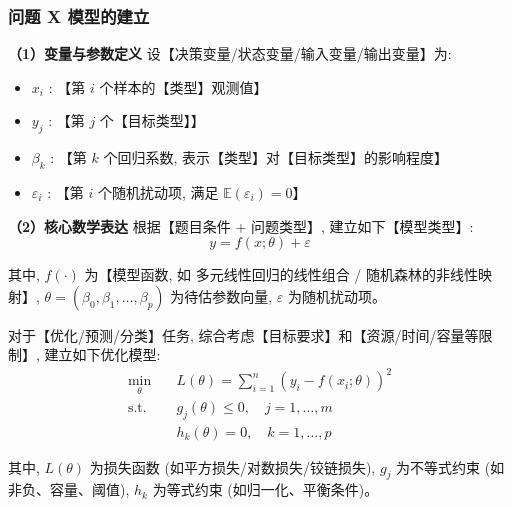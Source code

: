 
\subsubsection{问题 X 模型的建立}

\textbf{（1）变量与参数定义} \quad 设【决策变量/状态变量/输入变量/输出变量】为:
\begin{itemize}
  \item $x_i$ : 【第 $i$ 个样本的【类型】观测值】
  \item $y_j$ : 【第 $j$ 个【目标类型】】
  \item $\beta_k$ : 【第 $k$ 个回归系数, 表示【类型】对【目标类型】的影响程度】
  \item $\varepsilon_i$ : 【第 $i$ 个随机扰动项, 满足 $\mathbb{E}(\varepsilon_i)=0$】
\end{itemize}

\textbf{（2）核心数学表达} \quad 根据【题目条件 + 问题类型】, 建立如下【模型类型】:
\begin{equation}
  y = f(x; \theta) + \varepsilon
  \label{eq:model}
\end{equation}

其中, $f(\cdot)$ 为【模型函数, 如 多元线性回归的线性组合 / 随机森林的非线性映射】, $\theta = (\beta_0, \beta_1, \ldots, \beta_p)$ 为待估参数向量, $\varepsilon$ 为随机扰动项。

对于【优化/预测/分类】任务, 综合考虑【目标要求】和【资源/时间/容量等限制】, 建立如下优化模型:
\begin{align}
  \min_{\theta} \quad & L(\theta) = \sum_{i=1}^{n} (y_i - f(x_i; \theta))^2 \\
  \text{s.t.} \quad & g_j(\theta) \leq 0, \quad j=1,\ldots,m \\
  & h_k(\theta) = 0, \quad k=1,\ldots,p \label{eq:constraints}
\end{align}

其中, $L(\theta)$ 为损失函数 (如平方损失/对数损失/铰链损失), $g_j$ 为不等式约束 (如非负、容量、阈值), $h_k$ 为等式约束 (如归一化、平衡条件)。

